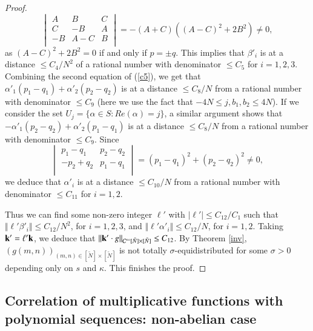 \documentclass[12pt,amstex]{amsart}
\theoremstyle{definition}
\def \A {\alpha}
\def \B {\beta}
\def \D {\kappa}
\begin{document}
\begin{proof}
\begin{equation}
\begin{vmatrix}
A & B &  C\\

C & -B & A\\

-B & A-C & B\\

\end{vmatrix}=-(A+C)((A-C)^{2}+2B^{2})\neq 0,
\end{equation}
as $(A-C)^{2}+2B^{2}=0$ if and only if $p=\pm q$. This implies that $\B'_{i}$ is at a distance $\leq C_{4}/N^{2}$ of a rational number with denominator $\leq C_{5}$ for $i=1,2,3$. Combining the second equation of (\ref{c5}), we get that $\A'_{1}(p_{1}-q_{1})+\A'_{2}(p_{2}-q_{2})$ is at a distance $\leq C_{8}/N$ from a rational number with denominator $\leq C_{9}$ (here we use the fact that $-4N\leq j,b_{1},b_{2}\leq 4N$). If we consider the set $U_{j}=\{\A\in S\colon Re(\A)=j\}$, a similar argument shows that $-\A'_{1}(p_{2}-q_{2})+\A'_{2}(p_{1}-q_{1})$ is at a distance $\leq C_{8}/N$ from a rational number with denominator $\leq C_{9}$. Since
 \begin{equation}\nonumber
\begin{vmatrix}

p_{1}-q_{1} & p_{2}-q_{2}\\

-p_{2}+q_{2} & p_{1}-q_{1}\\

\end{vmatrix}=(p_{1}-q_{1})^{2}+(p_{2}-q_{2})^{2}\neq 0,
\end{equation}
we deduce that $\A'_{i}$ is at a distance $\leq C_{10}/N$ from a rational number with denominator $\leq C_{11}$ for $i=1,2$.

Thus we can find some non-zero integer $\ell'$ with $\vert\ell'\vert\leq C_{12}/C_{1}$ such that $\Vert\ell'\B'_{i}\Vert\leq C_{12}/N^{2}$, for $i=1,2,3$, and $\Vert\ell'\A'_{i}\Vert\leq C_{12}/N$, for $i=1,2$. Taking $\bold{k}'=\ell'\bold{k}$, we deduce that $\Vert\bold{k}'\cdot g\Vert_{\mathcal{C}^{\infty}[\tilde{N}]\times[\tilde{N}]}\leq C_{12}$. By Theorem \ref{inv}, $(g(m,n))_{(m,n)\in[\tilde{N}]\times[\tilde{N}]}$ is not totally $\sigma$-equidistributed for some $\sigma>0$ depending only on $s$ and $\D$. This finishes the proof.
\end{proof}

\subsection{Correlation of multiplicative functions with polynomial sequences: non-abelian case}
\end{document}
